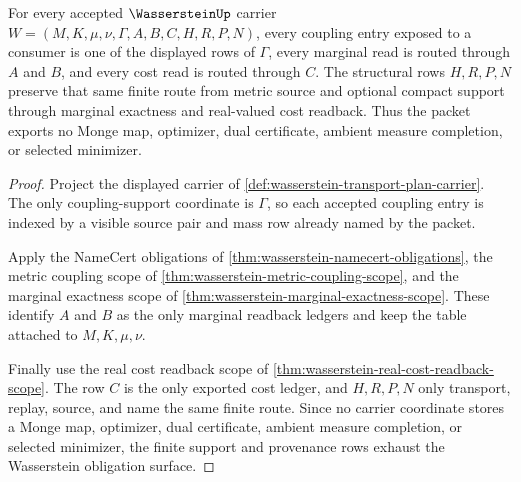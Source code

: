 \begin{theorem}
\label{thm:wasserstein-finite-coupling-obligation-surface}
For every accepted $\WassersteinUp$ carrier $W=(M,K,\mu,\nu,\Gamma,A,B,C,H,R,P,N)$, every coupling entry exposed to a consumer is one of the displayed rows of $\Gamma$, every marginal read is routed through $A$ and $B$, and every cost read is routed through $C$. The structural rows $H,R,P,N$ preserve that same finite route from metric source and optional compact support through marginal exactness and real-valued cost readback. Thus the packet exports no Monge map, optimizer, dual certificate, ambient measure completion, or selected minimizer.
\end{theorem}
\begin{proof}
Project the displayed carrier of \autoref{def:wasserstein-transport-plan-carrier}. The only coupling-support coordinate is $\Gamma$, so each accepted coupling entry is indexed by a visible source pair and mass row already named by the packet.

Apply the NameCert obligations of \autoref{thm:wasserstein-namecert-obligations}, the metric coupling scope of \autoref{thm:wasserstein-metric-coupling-scope}, and the marginal exactness scope of \autoref{thm:wasserstein-marginal-exactness-scope}. These identify $A$ and $B$ as the only marginal readback ledgers and keep the table attached to $M,K,\mu,\nu$.

Finally use the real cost readback scope of \autoref{thm:wasserstein-real-cost-readback-scope}. The row $C$ is the only exported cost ledger, and $H,R,P,N$ only transport, replay, source, and name the same finite route. Since no carrier coordinate stores a Monge map, optimizer, dual certificate, ambient measure completion, or selected minimizer, the finite support and provenance rows exhaust the Wasserstein obligation surface.
\end{proof}

